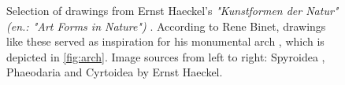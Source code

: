 \documentclass{article}
\begin{document}
\begin{figure}
    \centering
    \caption{Selection of drawings from Ernst Haeckel's \textit{"Kunstformen der Natur" (en.: "Art Forms in Nature")} \cite{haeckel_kunstformen_2012}. According to Rene Binet, drawings like these served as inspiration for his monumental arch \cite[Sec. "Haeckel und der Jugendstil"]{willmann_haeckel_2019}, which is depicted in \cref{fig:arch}. Image sources from left to right: Spyroidea \cite{haeckel_kunstformen_1904}, Phaeodaria \cite{haeckel_kunstformen_1904} and Cyrtoidea \cite{haeckel_kunstformen_1904-2} by Ernst Haeckel.}
    \label{fig:kunstformen}
\end{figure}
\end{document}
